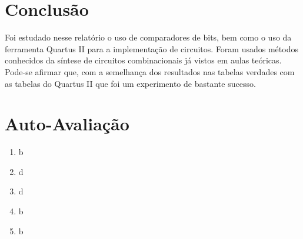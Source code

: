 \documentclass[12pt]{article}
\begin{document}
\section{Conclusão}
\label{sec:Conclusao}
Foi estudado nesse relatório o uso de comparadores de bits, bem como o uso da
ferramenta Quartus II para a implementação de circuitos. Foram usados métodos
conhecidos da síntese de circuitos combinacionais já vistos em aulas teóricas.
Pode-se afirmar que, com a semelhança dos resultados nas tabelas verdades com
as tabelas do Quartus II que foi um experimento de bastante sucesso.
\newpage 
\section*{Auto-Avaliação}

\begin{enumerate}
    \item b
    \item d
    \item d
    \item b
    \item b
\end{enumerate}
\end{document}
